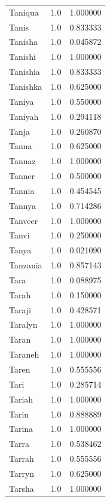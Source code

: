 \documentclass[
  letterpaper,
  DIV=11,
  numbers=noendperiod]{scrreprt}
\begin{document}
\begin{tabular}{lrr}
Taniqua         &   1.0 &   1.000000 \\
Tanis           &   1.0 &   0.833333 \\
Tanisha         &   1.0 &   0.045872 \\
Tanishi         &   1.0 &   1.000000 \\
Tanishia        &   1.0 &   0.833333 \\
Tanishka        &   1.0 &   0.625000 \\
Taniya          &   1.0 &   0.550000 \\
Taniyah         &   1.0 &   0.294118 \\
Tanja           &   1.0 &   0.260870 \\
Tanna           &   1.0 &   0.625000 \\
Tannaz          &   1.0 &   1.000000 \\
Tanner          &   1.0 &   0.500000 \\
Tannia          &   1.0 &   0.454545 \\
Tannya          &   1.0 &   0.714286 \\
Tanveer         &   1.0 &   1.000000 \\
Tanvi           &   1.0 &   0.250000 \\
Tanya           &   1.0 &   0.021090 \\
Tanzania        &   1.0 &   0.857143 \\
Tara            &   1.0 &   0.088975 \\
Tarah           &   1.0 &   0.150000 \\
Taraji          &   1.0 &   0.428571 \\
Taralyn         &   1.0 &   1.000000 \\
Taran           &   1.0 &   1.000000 \\
Taraneh         &   1.0 &   1.000000 \\
Taren           &   1.0 &   0.555556 \\
Tari            &   1.0 &   0.285714 \\
Tariah          &   1.0 &   1.000000 \\
Tarin           &   1.0 &   0.888889 \\
Tarina          &   1.0 &   1.000000 \\
Tarra           &   1.0 &   0.538462 \\
Tarrah          &   1.0 &   0.555556 \\
Tarryn          &   1.0 &   0.625000 \\
Tarsha          &   1.0 &   1.000000 \\

\end{tabular}
\end{document}
